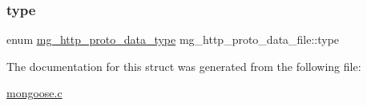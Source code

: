 \subsubsection{\texorpdfstring{type}{type}}
{\footnotesize\ttfamily enum \hyperlink{mongoose_8c_add7d33f71bab19f76742bd7b30f389e3_add7d33f71bab19f76742bd7b30f389e3}{mg\+\_\+http\+\_\+proto\+\_\+data\+\_\+type} mg\+\_\+http\+\_\+proto\+\_\+data\+\_\+file\+::type}



The documentation for this struct was generated from the following file\+:\begin{DoxyCompactItemize}
\item 
\hyperlink{mongoose_8c}{mongoose.\+c}\end{DoxyCompactItemize}
